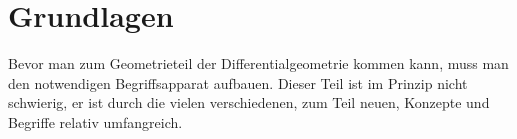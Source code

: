 \documentclass[a4paper, 12pt, halfparskip*,titlepage]{scrreprt}
\begin{document}


\pagestyle{empty}
\tableofcontents
\newpage
\pagestyle{plain}

\chapter{Grundlagen}
\label{chap:basics}

Bevor man zum Geometrieteil der Differentialgeometrie kommen kann,
muss man den notwendigen Begriffsapparat aufbauen. Dieser Teil ist
im Prinzip nicht schwierig, er ist durch die vielen verschiedenen, zum
Teil neuen, Konzepte und Begriffe relativ umfangreich.

%







%
\end{document}
